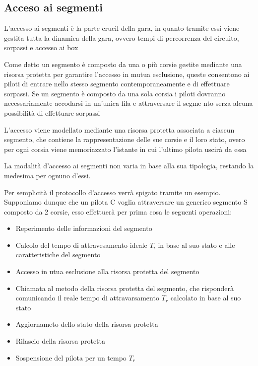\documentclass[a4paper,11pt, twoside]{book}
\begin{document}
	      
      \subsection{Acceso ai segmenti}
        L'accesso ai segmenti è la parte crucil della gara, in quanto tramite essi viene gestita
	tutta la dinamica della gara, ovvero tempi di percorrenza del circuito, sorpassi e accesso ai box
	
	Come detto un segmento è composto da una o più corsie gestite mediante una risorsa protetta per garantire
	l'accesso in mutua esclusione, queste consentono ai piloti di entrare nello stesso segmento 
	contemporaneamente e di effettuare sorpassi.
	Se un segmento è composto da una sola corsia i piloti dovranno necessariamente accodarsi in un'unica fila e attraversare
	il segme nto serza alcuna possibilità di effettuare sorpassi
	
	L'accesso viene modellato mediante una risorsa protetta associata a ciascun segmento, che contiene
	la rappresentazione delle sue corsie e il loro stato, overo per ogni corsia viene memoriazzato l'istante
	in cui l'ultimo pilota uscirà da essa
	
	La modalità d'accesso ai segmenti non varia in base alla sua tipologia, restando la medesima per ognuno d'essi.
	
	Per semplicità il protocollo d'accesso verrà spigato tramite un esempio. Supponiamo dunque che un pilota C
	voglia attraversare un generico segmento S composto da 2 corsie, esso effettuerà per prima cosa le seguenti operazioni:
	
	\begin{itemize}
	  \item Reperimento delle informazioni del segmento
	  \item Calcolo del tempo di attravesamento ideale $T_i$ in base al suo stato e alle caratteristiche del segmento
	  \item Accesso in utua esclusione alla risorsa protetta del segmento
	  \item Chiamata al metodo della risorsa protetta del segmento, che risponderà comunicando il reale tempo
	        di attravarsamento $T_r$ calcolato in base al suo stato
          \item Aggiornameto dello stato della risorsa protetta
          \item Rilascio della risorsa protetta
          \item Sospensione del pilota per un tempo $T_r$
	\end{itemize}
	
\end{document}
